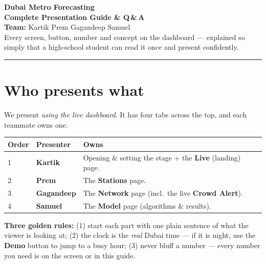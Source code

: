 \documentclass[11pt]{article}
\begin{document}
\begin{center}
  {\Huge\bfseries\color{metroRed} Dubai Metro Forecasting}\\[3pt]
  {\LARGE\bfseries Complete Presentation Guide \& Q\,\&\,A}\\[6pt]
  {\normalsize \textbf{Team:} Kartik \;\textbullet\; Prem \;\textbullet\; Gagandeep \;\textbullet\; Samuel}\\[3pt]
  {\small Every screen, button, number and concept on the dashboard --- explained so simply that a
  high-school student can read it once and present confidently.}\\[4pt]
  {\color{metroGreen}\rule{0.6\textwidth}{1.2pt}}
\end{center}

\section{Who presents what}
We present \emph{using the live dashboard}. It has four tabs across the top, and each teammate owns one.

\begin{center}
\begin{tabular}{llp{8.2cm}}
\toprule
\textbf{Order} & \textbf{Presenter} & \textbf{Owns}\\
\midrule
1 & \textbf{Kartik}    & Opening \& setting the stage + the \textbf{Live} (landing) page.\\
2 & \textbf{Prem}      & The \textbf{Stations} page.\\
3 & \textbf{Gagandeep} & The \textbf{Network} page (incl.\ the live \textbf{Crowd Alert}).\\
4 & \textbf{Samuel}    & The \textbf{Model} page (algorithms \& results).\\
\bottomrule
\end{tabular}
\end{center}

\noindent\textbf{Three golden rules:} (1) start each part with one plain sentence of what the
viewer is looking at; (2) the clock is the \emph{real} Dubai time --- if it is night, use the
\textbf{Demo} button to jump to a busy hour; (3) never bluff a number --- every number you need is on
the screen or in this guide.

\end{document}
